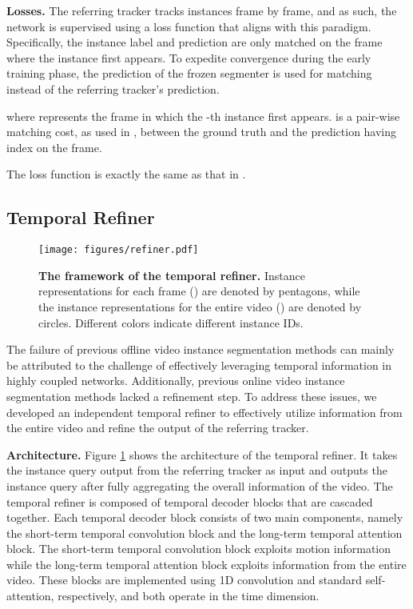 \documentclass[10pt,twocolumn,letterpaper]{article}
\begin{document}
\textbf{Losses.} The referring tracker tracks instances frame by frame, and as such, the network is supervised using a loss function that aligns with this paradigm. Specifically, the instance label and prediction  are only matched on the frame where the instance first appears. To expedite convergence during the early training phase, the prediction of the frozen segmenter  is used for matching instead of the referring tracker's prediction.

where  represents the frame in which the -th instance first appears.  is a pair-wise matching cost, as used in \cite{mask2formervis}, between the ground truth  and the prediction  having index  on the  frame.

The loss function  is exactly the same as that in \cite{mask2formervis}.


\subsection{Temporal Refiner}\label{sec:offline}
\begin{figure}[t]
\begin{center}
\texttt{[image: figures/refiner.pdf]}\vspace{-2mm}
\end{center}
\caption{\textbf{The framework of the temporal refiner.} Instance representations for each frame () are denoted by pentagons, while the instance representations for the entire video () are denoted by circles. Different colors indicate different instance IDs.}\vspace{-3mm}
\label{fig:offline_tracker}
\end{figure}
The failure of previous offline video instance segmentation methods can mainly be attributed to the challenge of effectively leveraging temporal information in highly coupled networks. Additionally, previous online video instance segmentation methods lacked a refinement step. To address these issues, we developed an independent temporal refiner to effectively utilize information from the entire video and refine the output of the referring tracker.

\textbf{Architecture.} Figure \ref{fig:offline_tracker} shows the architecture of the temporal refiner. It takes the instance query  output from the referring tracker as input and outputs the instance query  after fully aggregating the overall information of the video. The temporal refiner is composed of  temporal decoder blocks that are cascaded together. Each temporal decoder block consists of two main components, namely the short-term temporal convolution block and the long-term temporal attention block. The short-term temporal convolution block exploits motion information while the long-term temporal attention block exploits information from the entire video. These blocks are implemented using 1D convolution and standard self-attention, respectively, and both operate in the time dimension.  
\end{document}
